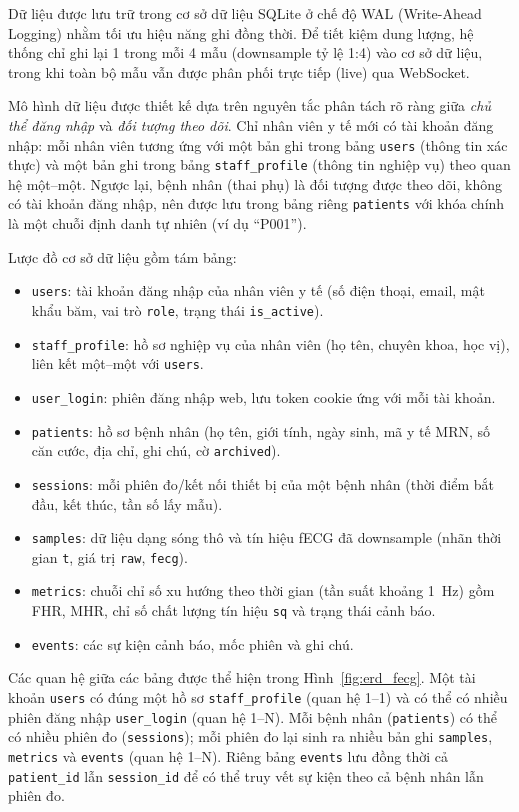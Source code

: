 \documentclass[../DoAn.tex]{subfiles}
\begin{document}
Dữ liệu được lưu trữ trong cơ sở dữ liệu SQLite ở chế độ WAL (Write-Ahead Logging) nhằm tối ưu hiệu năng ghi đồng thời. Để tiết kiệm dung lượng, hệ thống chỉ ghi lại 1 trong mỗi 4 mẫu (downsample tỷ lệ 1:4) vào cơ sở dữ liệu, trong khi toàn bộ mẫu vẫn được phân phối trực tiếp (live) qua WebSocket.

Mô hình dữ liệu được thiết kế dựa trên nguyên tắc phân tách rõ ràng giữa \textit{chủ thể đăng nhập} và \textit{đối tượng theo dõi}. Chỉ nhân viên y tế mới có tài khoản đăng nhập: mỗi nhân viên tương ứng với một bản ghi trong bảng \texttt{users} (thông tin xác thực) và một bản ghi trong bảng \texttt{staff\_profile} (thông tin nghiệp vụ) theo quan hệ một--một. Ngược lại, bệnh nhân (thai phụ) là đối tượng được theo dõi, không có tài khoản đăng nhập, nên được lưu trong bảng riêng \texttt{patients} với khóa chính là một chuỗi định danh tự nhiên (ví dụ ``P001'').

Lược đồ cơ sở dữ liệu gồm tám bảng:
\begin{itemize}
  \item \texttt{users}: tài khoản đăng nhập của nhân viên y tế (số điện thoại, email, mật khẩu băm, vai trò \texttt{role}, trạng thái \texttt{is\_active}).
  \item \texttt{staff\_profile}: hồ sơ nghiệp vụ của nhân viên (họ tên, chuyên khoa, học vị), liên kết một--một với \texttt{users}.
  \item \texttt{user\_login}: phiên đăng nhập web, lưu token cookie ứng với mỗi tài khoản.
  \item \texttt{patients}: hồ sơ bệnh nhân (họ tên, giới tính, ngày sinh, mã y tế MRN, số căn cước, địa chỉ, ghi chú, cờ \texttt{archived}).
  \item \texttt{sessions}: mỗi phiên đo/kết nối thiết bị của một bệnh nhân (thời điểm bắt đầu, kết thúc, tần số lấy mẫu).
  \item \texttt{samples}: dữ liệu dạng sóng thô và tín hiệu fECG đã downsample (nhãn thời gian \texttt{t}, giá trị \texttt{raw}, \texttt{fecg}).
  \item \texttt{metrics}: chuỗi chỉ số xu hướng theo thời gian (tần suất khoảng 1~Hz) gồm FHR, MHR, chỉ số chất lượng tín hiệu \texttt{sq} và trạng thái cảnh báo.
  \item \texttt{events}: các sự kiện cảnh báo, mốc phiên và ghi chú.
\end{itemize}

Các quan hệ giữa các bảng được thể hiện trong Hình~\ref{fig:erd_fecg}. Một tài khoản \texttt{users} có đúng một hồ sơ \texttt{staff\_profile} (quan hệ 1--1) và có thể có nhiều phiên đăng nhập \texttt{user\_login} (quan hệ 1--N). Mỗi bệnh nhân (\texttt{patients}) có thể có nhiều phiên đo (\texttt{sessions}); mỗi phiên đo lại sinh ra nhiều bản ghi \texttt{samples}, \texttt{metrics} và \texttt{events} (quan hệ 1--N). Riêng bảng \texttt{events} lưu đồng thời cả \texttt{patient\_id} lẫn \texttt{session\_id} để có thể truy vết sự kiện theo cả bệnh nhân lẫn phiên đo.
\end{document}
